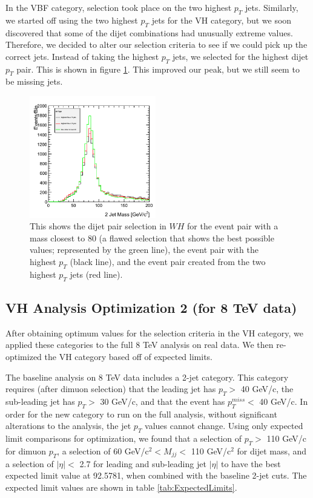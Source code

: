 \documentclass[12pt]{article}
\begin{document}
In the VBF category, selection took place on the two highest $p_{T}$ jets. 
Similarly, we started off using the two highest $p_{T}$ jets for the VH category, 
but we soon discovered that some of the dijet combinations had unusually extreme values. 
Therefore, we decided to alter our selection criteria to see if we could pick up the correct jets. 
Instead of taking the highest $p_{T}$ jets, we selected for the highest dijet $p_{T}$ pair. This is shown 
in figure \ref{fig:dijetSel}. This improved our peak, but we still seem to be missing jets.
\begin{figure}[!hbtp]
\begin{center}
    \includegraphics[width=0.49\textwidth]{images/Hist_Reco2PlotsPt30Eta2.png}
    \caption{ \label{fig:dijetSel}
         This shows the dijet pair selection in $WH$ for the event pair with a mass closest to 80 (a flawed selection that 
	 shows the best possible values; represented by the green line), the event pair with the highest $p_{T}$ (black line), 
	 and the event pair created from the two highest $p_{T}$ jets (red line).
      }
\end{center}
\end{figure}

\subsection{VH Analysis Optimization 2 (for 8 TeV data)}

After obtaining optimum values for the selection criteria in the VH category, we applied these categories to the full 8 TeV analysis on real data. 
We then re-optimized the VH category based off of expected limits. 

The baseline analysis on 8 TeV data includes a 2-jet category. This category requires (after dimuon selection) 
that the leading jet has $p_{T} >$ 40 GeV/c, the sub-leading jet has $p_{T} >$ 30 GeV/c, and that the event has $p_{T}^{miss} <$ 40 GeV/c. 
In order for the new category to run
on the full analysis, without significant alterations to the analysis, the jet $p_{T}$ values cannot change. Using only expected limit comparisons for 
optimization, we found that a selection of $p_{T}>$ 110 GeV/c for dimuon $p_{T}$, 
a selection of 60 GeV/c$^{2}< M_{jj}<$ 110 GeV/c$^{2}$ for dijet mass, and a selection of $|\eta|<$ 2.7 for leading and sub-leading 
jet $|\eta|$ to have the best expected limit value at 92.5781, when combined with the baseline 2-jet cuts. 
The expected limit values are shown in table \ref{tab:ExpectedLimits}.
\end{document}
